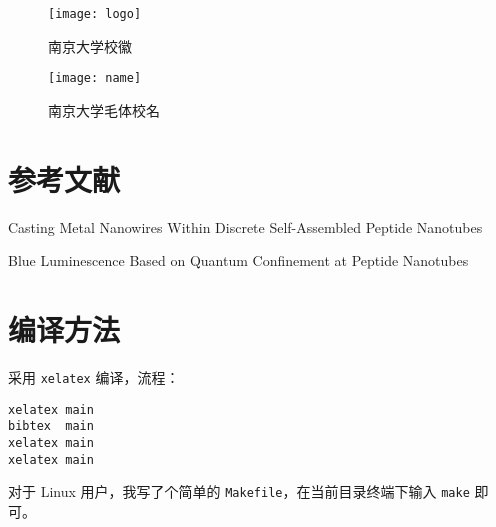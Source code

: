 \begin{figure}[htbp]
\centerline{\texttt{[image: logo]}}
\caption{南京大学校徽}
\label{fig:logo}
\end{figure}

\begin{figure}[htbp]
\centerline{\texttt{[image: name]}}
\caption{南京大学毛体校名}
\label{fig:name}
\end{figure}


\section{参考文献}
Casting Metal Nanowires Within Discrete Self-Assembled Peptide Nanotubes{\cite{casting}}

Blue Luminescence Based on Quantum Confinement at Peptide Nanotubes{\cite{qc}}

\section{编译方法}
采用 \texttt{xelatex} 编译，流程：
\begin{verbatim}
xelatex main
bibtex  main
xelatex main
xelatex main
\end{verbatim}
对于 Linux 用户，我写了个简单的 \texttt{Makefile}，在当前目录终端下输入 \texttt{make} 即可。

